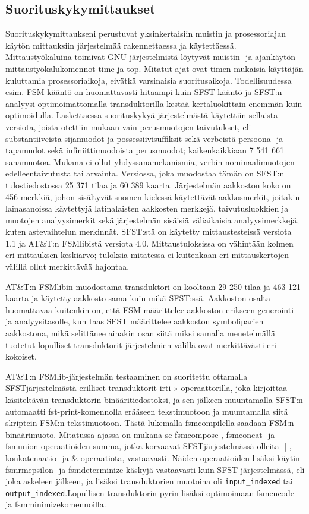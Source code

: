 \documentclass[free]{flammie}
\begin{document}
\subsection{Suorituskykymittaukset}

Suorituskykymittaukseni perustuvat yksinkertaisiin muistin ja prosessoriajan käytön mittauksiin järjestelmää rakennettaessa ja käytettäessä. Mittaustyökaluina toimivat GNU-järjestelmistä löytyvät muistin- ja ajankäytön mittaustyökalukomennot time ja top. Mitatut ajat ovat timen mukaisia käyttäjän kuluttamia prosessoriaikoja, eivätkä varsinaisia suoritusaikoja. Todellisuudessa esim. FSM-kääntö on
huomattavasti hitaampi kuin SFST-kääntö ja SFST:n analyysi optimoimattomalla transduktorilla kestää kertaluokittain enemmän kuin optimoidulla. Laskettaessa suorituskykyä järjestelmästä käytettiin sellaista versiota, joista otettiin mukaan
vain perusmuotojen taivutukset, eli substantiiveista sijamuodot ja possessiivisuffiksit sekä verbeistä persoona- ja tapamudot sekä infiniittimuodoista perusmuodot;
kaikenkaikkiaan 7 541 661 sanamuotoa. Mukana ei ollut yhdyssanamekanismia,
verbin nominaalimuotojen edelleentaivutusta tai arvainta. Versiossa, joka muodostaa tämän on SFST:n tulostiedostossa 25 371 tilaa ja 60 389 kaarta. Järjestelmän aakkoston koko on 456 merkkiä, johon sisältyvät suomen kielessä käytettävät
aakkosmerkit, joitakin lainasanoissa käytettyjä latinalaisten aakkosten merkkejä,
taivutusluokkien ja muotojen analyysimerkit sekä järjestelmän sisäisiä
väliaikaisia analyysimerkkejä, kuten astevaihtelun merkinnät. SFST:stä on
käytetty mittaustesteissä versiota 1.1 ja AT\&T:n FSMlibistä versiota 4.0. Mittaustuloksissa on
vähintään kolmen eri mittauksen keskiarvo; tuloksia mitatessa ei kuitenkaan eri
mittauskertojen välillä ollut merkittävää hajontaa.

AT\&T:n FSMlibin muodostama transduktori on kooltaan 29 250 tilaa ja 463 121
kaarta ja käytetty aakkosto sama kuin mikä SFST:ssä. Aakkoston osalta huomattavaa kuitenkin on, että FSM määrittelee aakkoston erikseen generointi- ja analyysitasolle, kun taas SFST määrittelee aakkoston symboliparien aakkostona, mikä
selittänee ainakin osan siitä miksi samalla menetelmällä tuotetut lopulliset transduktorit järjestelmien välillä ovat merkittävästi eri kokoiset.

AT\&T:n FSMlib-järjestelmän testaaminen on suoritettu ottamalla SFSTjärjestelmästä erilliset transduktorit irti »-operaattorilla, joka kirjoittaa käsiteltävän transduktorin binääritiedostoksi, ja sen jälkeen muuntamalla SFST:n
automaatti fst-print-komennolla erääseen tekstimuotoon ja muuntamalla
siitä skriptein FSM:n tekstimuotoon. Tästä lukemalla fsmcompilella saadaan FSM:n binäärimuoto. Mitatussa ajassa on mukana se fsmcompose-,
fsmconcat- ja fsmunion-operaatioiden summa, jotka korvaavat SFSTjärjestelmässä
olleita ||-, konkatenaatio- ja \&-operaatiota, vastaavasti. Näiden
operaatioiden lisäksi käytin fsmrmepsilon- ja fsmdeterminize-käskyjä
vastaavasti kuin SFST-järjestelmässä, eli joka askeleen jälkeen, ja lisäksi
transduktorien muotoina oli \verb|input_indexed| tai \verb|output_indexed|.Lopullisen transduktorin pyrin lisäksi optimoimaan fsmencode- ja fsmminimizekomennoilla.
\end{document}
